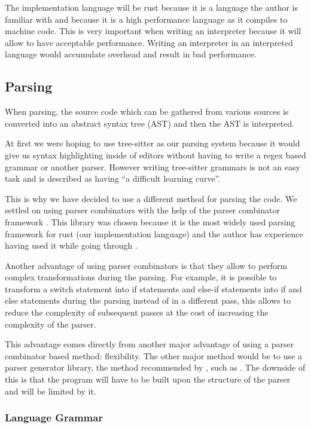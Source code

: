 \documentclass{article}
\begin{document}
The implementation language will be rust because it is a language the author is
familiar with and because it is a high performance language as it compiles to
machine code. This is very important when writing an interpreter because it
will allow to have acceptable performance. Writing an interpreter in an
interpreted language would accumulate overhead and result in bad performance.

\subsection{Parsing}

When parsing, the source code which can be gathered from various sources is
converted into an abstract syntax tree (AST) and then the AST is interpreted.

At first we were hoping to use tree-sitter as our parsing system because it
would give us syntax highlighting inside of editors without having to write a
regex based grammar or another parser. However writing tree-sitter grammars is
not an easy task and is described as having ``a difficult learning
curve''\cite{ts_creating_parsers}.

This is why we have decided to use a different method for parsing the code. We
settled on using parser combinators with the help of the parser combinator
framework \textcite{nom}. This library was chosen because it is the most widely
used parsing framework for rust (our implementation language) and the author
has experience having used it while going through \textcite{eopl}.

Another advantage of using parser combinators is that they allow to perform
complex transformations during the parsing. For example, it is possible to
transform a switch statement into if statements and else-if statements into
if and else statements during the parsing instead of in a different pass, this
allows to reduce the complexity of subsequent passes at the cost of increasing
the complexity of the parser.

This advantage comes directly from another major advantage of using a parser
combinator based method: flexibility. The other major method would be to use a
parser generator library, the method recommended by \textcite{eopl}, such as
\textcite{bison}. The downside of this is that the program will have to be
built upon the structure of the parser and will be limited by it.

\subsubsection{Language Grammar}
\end{document}
